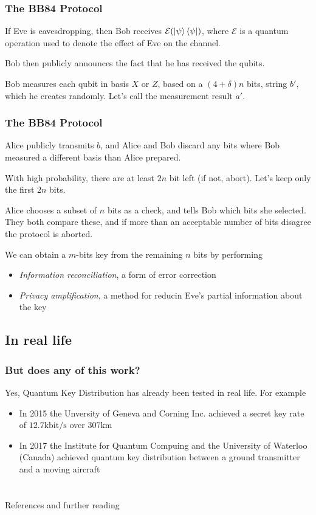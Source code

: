\documentclass{beamer}
\begin{document}
  \begin{frame}
    \frametitle{The BB84 Protocol}
    If Eve is eavesdropping, then Bob receives $\mathcal E(\ket{\psi}\bra{\psi})$, where
    $\mathcal E$ is a quantum operation used to denote the effect of Eve on the channel.

    \pause
    Bob then publicly announces the fact that he has received the qubits.

    \pause
    Bob measures each qubit in basis $X$ or $Z$, based on a $(4+\delta)n$ bits,
    string $b'$, which he creates randomly. Let's call the measurement result $a'$.
  \end{frame}

  \begin{frame}
    \frametitle{The BB84 Protocol}
    Alice publicly transmits $b$, and Alice and Bob discard any bits where Bob measured
    a different basis than Alice prepared.

    \pause
    With high probability, there are at least $2n$ bit left (if not, abort). Let's keep only the first $2n$ bits.

    \pause
    Alice chooses a subset of $n$ bits as a check, and tells Bob which bits she selected.
    They both compare these, and if more than an acceptable number of bits disagree the protocol is aborted.

    \pause
    We can obtain a $m$-bits key from the remaining $n$ bits by performing
    \begin{itemize}
      \item \textit{Information reconciliation}, a form of error correction
      \item \textit{Privacy amplification}, a method for reducin Eve's partial information about the key
    \end{itemize}
  \end{frame}

  \subsection{In real life}
  \begin{frame}
    \frametitle{But does any of this work?}
    Yes, Quantum Key Distribution has already been tested in real life.
    For example
    \begin{itemize}
      \item In 2015 the Unversity of Geneva and Corning Inc. achieved a secret key
            rate of $12.7 \mathrm{kbit/s}$ over $307 \mathrm{km}$ \cite{qkd}
      \item In 2017 the Institute for Quantum Compuing and the University of Waterloo (Canada) achieved
            quantum key distribution between a ground transmitter and a moving aircraft \cite{airborne}
    \end{itemize}
  \end{frame}
  
  \section*{}
  \begin{frame}{References and further reading}
    \nocite{*}
    
    
  \end{frame}
\end{document}
